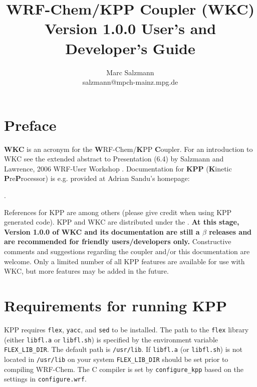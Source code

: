\documentclass[twoside, 12pt, letterpaper]{article}
\begin{document}
\title{\Large \bf WRF-Chem/KPP Coupler (WKC)\\ \vspace*{4mm} Version 1.0.0 User's and Developer's Guide\vspace*{-4mm}}
\author{Marc Salzmann\\ salzmann@mpch-mainz.mpg.de}
\maketitle
\tableofcontents
\vfill
\pagebreak
\section{Preface}
{\bf WKC} is an acronym for the {\bf W}RF-Chem/{\bf K}PP {\bf C}oupler. For an introduction to WKC see the extended abstract to Presentation (6.4) by Salzmann and Lawrence, 2006 WRF-User Workshop . Documentation for {\bf KPP} ({\bf K}inetic {\bf P}re{\bf P}rocessor) is e.g. provided at Adrian Sandu's homepage:
\begin{center}
.
\end{center}
References for KPP are among others \cite{dam02, sandu03,s+s06} (please give credit when using KPP generated code). KPP and WKC are distributed under the . {\bf At this stage, Version 1.0.0 of WKC and its documentation are still a $\beta$ releases and are recommended for friendly users/developers only.} Constructive comments and suggestions regarding the coupler and/or this documentation are welcome. Only a limited number of all KPP features are available for use with WKC, but more features may be added in the future. 



\section{Requirements for running KPP}
 KPP requires {\tt flex}, {\tt yacc}, and {\tt sed} to be installed. The 
 path to the {\tt flex} library (either {\tt libfl.a} or {\tt libfl.sh}) is specified by the environment variable {\tt FLEX\_LIB\_DIR}. The default path is {\tt /usr/lib}. If {\tt libfl.a} (or {\tt libfl.sh}) is not located in {\tt /usr/lib} on your system {\tt FLEX\_LIB\_DIR} should be set prior to compiling WRF-Chem. The C compiler is set by {\tt configure\_kpp} based on the settings in {\tt configure.wrf}. 
\end{document}
